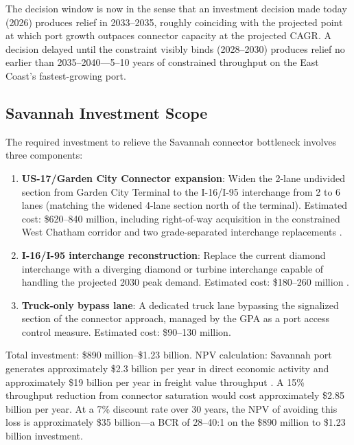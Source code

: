 The decision window is now in the sense that an investment decision made today (2026) produces relief in 2033--2035, roughly coinciding with the projected point at which port growth outpaces connector capacity at the projected CAGR. A decision delayed until the constraint visibly binds (2028--2030) produces relief no earlier than 2035--2040---5--10 years of constrained throughput on the East Coast's fastest-growing port.

\subsection{Savannah Investment Scope}

The required investment to relieve the Savannah connector bottleneck involves three components:

\begin{enumerate}
  \item \textbf{US-17/Garden City Connector expansion}: Widen the 2-lane undivided section from Garden City Terminal to the I-16/I-95 interchange from 2 to 6 lanes (matching the widened 4-lane section north of the terminal). Estimated cost: \$620--840 million, including right-of-way acquisition in the constrained West Chatham corridor and two grade-separated interchange replacements \citep{GDOT_2023}.

  \item \textbf{I-16/I-95 interchange reconstruction}: Replace the current diamond interchange with a diverging diamond or turbine interchange capable of handling the projected 2030 peak demand. Estimated cost: \$180--260 million \citep{FHWA_freight2023}.

  \item \textbf{Truck-only bypass lane}: A dedicated truck lane bypassing the signalized section of the connector approach, managed by the GPA as a port access control measure. Estimated cost: \$90--130 million.
\end{enumerate}

Total investment: \$890 million--\$1.23 billion. NPV calculation: Savannah port generates approximately \$2.3 billion per year in direct economic activity and approximately \$19 billion per year in freight value throughput \citep{GPA_annual2023}. A 15\% throughput reduction from connector saturation would cost approximately \$2.85 billion per year. At a 7\% discount rate over 30 years, the NPV of avoiding this loss is approximately \$35 billion---a BCR of 28--40:1 on the \$890 million to \$1.23 billion investment.
